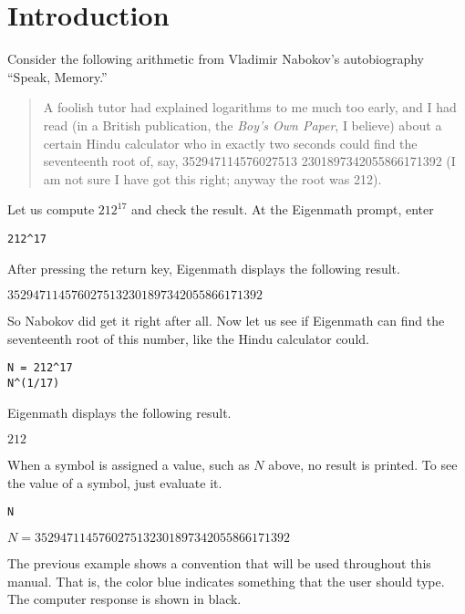 \section{Introduction}

\noindent
Consider the following arithmetic from Vladimir Nabokov's autobiography ``Speak, Memory.''

\begin{quote}
A foolish tutor had explained logarithms to me much too early, and I had
read (in a British publication, the {\it Boy's Own Paper}, I believe)
about a certain Hindu calculator who in exactly two seconds could find the
seventeenth root of, say,
352947114576027513 2301897342055866171392
(I am not sure I have got this right; anyway the root was 212).
\end{quote}

\noindent
Let us compute $212^{17}$ and check the result.
At the Eigenmath prompt, enter

{\color{blue}
\begin{verbatim}
212^17
\end{verbatim}
}

\noindent
After pressing the return key, Eigenmath displays the following result.

\bigskip
\noindent
$3529471145760275132301897342055866171392$

\bigskip
\noindent
So Nabokov did get it right after all.
Now let us see if Eigenmath can find the
seventeenth root of this number, like the Hindu calculator could.

{\color{blue}
\begin{verbatim}
N = 212^17
N^(1/17)
\end{verbatim}
}

\noindent
Eigenmath displays the following result.

\bigskip
\noindent
$212$

\bigskip
\noindent
When a symbol is assigned a value, such as $N$ above,
no result is printed.
To see the value of a symbol, just evaluate it.

{\color{blue}
\begin{verbatim}
N
\end{verbatim}
}

\noindent
$N=3529471145760275132301897342055866171392$

\bigskip
\noindent
The previous example shows a convention that will be used throughout
this manual.
That is, the color blue indicates something that the user should type.
The computer response is shown in black.
